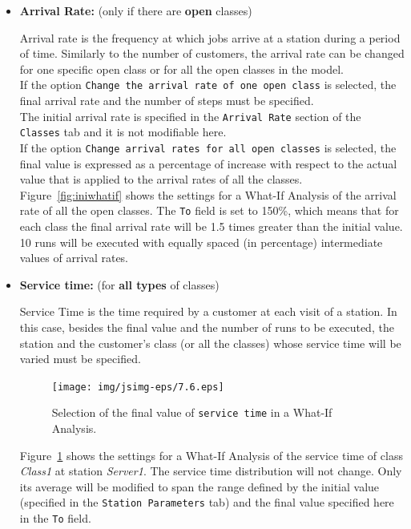 \begin{itemize}
\item \textbf{Arrival Rate:} (only if there are \textbf{open}
classes)

Arrival rate is the frequency at which jobs arrive at a station
during a period of time. Similarly to the number of customers, the
arrival rate can be changed for one specific open class or for all
the open classes in the model.\\ If the option \texttt{Change the
arrival rate of one open class} is selected, the final arrival
rate and the number of steps must be specified.\\
The initial arrival rate is specified in the \texttt{Arrival Rate}
section of the \texttt{Classes} tab and it is not modifiable
here.\\
If the option \texttt{Change arrival rates for all open classes}
is selected, the final value is expressed as a percentage of
increase with respect to the actual value that is applied to the
arrival rates of all the classes.
Figure~\ref{fig:iniwhatif} shows the settings for a What-If
Analysis of the arrival rate of all the open classes. The
\texttt{To} field is set to 150\%, which means that for each class
the final arrival rate will be 1.5 times greater than the initial
value. 10 runs will be executed with equally spaced (in
percentage) intermediate values of arrival rates.

\item \textbf{Service time:} (for \textbf{all types} of classes)

Service Time is the time required by a customer at each visit of a
station. In this case, besides the final value and the number of
runs to be executed, the station and the customer's class (or all
the classes) whose service time will be varied must be specified.
\begin{figure}[hbt]
    \begin{center}
        \texttt{[image: img/jsimg-eps/7.6.eps]}
    \end{center}
    \caption{Selection of the final value of \texttt{service time}
    in a What-If Analysis.}
    \label{fig:selservti}
\end{figure}
Figure~\ref{fig:selservti} shows the settings for a What-If
Analysis of the service time of class \emph{Class1} at station
\emph{Server1}. The service time distribution will not change.
Only its average will be modified to span the range defined by the
initial value (specified in the \texttt{Station Parameters} tab)
and the final value specified here in the \texttt{To} field.


\end{itemize}
